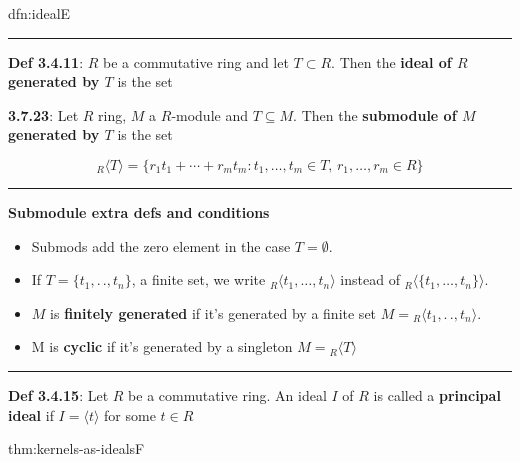 \documentclass[landscape, 8pt]{extarticle}
\begin{document}
\begin{multicols}{3}
\begin{dfn}{dfn:ideal}{E}
    \vspace{-7pt}
    \noindent\rule{\textwidth}{0.2pt}
    \vspace{-23pt}
    \setlength{\columnseprule}{0.5pt}
    \begin{multicols}{2}
        \textbf{Def 3.4.11}: $R$ be a commutative ring and let $T \subset R$. Then the \textbf{ideal of $R$ generated by $T$} is the set

        \columnbreak
        \textbf{3.7.23}: Let $R$ ring, $M$ a $R$-module and $T \subseteq M$. Then the \textbf{submodule of $M$ generated by $T$} is the set

    \end{multicols}
    \vspace{-20pt}

    \[{}_{R}\langle T \rangle = \{r_{1}t_{1}+\cdots+r_{m}t_{m} : t_{1},\dots,t_{m}\in T,\,r_{1},\dots,r_{m}\in R\}\]
    \vspace{-10pt}
    \noindent\rule{\textwidth}{0.2pt}

    \textbf{Submodule extra defs and conditions}
    \vspace{-3pt}
    \begin{itemize}[leftmargin=4pt, rightmargin=-2pt]
        \setlength\itemsep{0em}
        \item Submods add the zero element in the case $T = \emptyset$.
        \item If $T = \{t_{1},.\,.,t_{n}\}$, a finite set, we write ${}_{R}\langle t_{1},\dots,t_{n} \rangle$ instead of ${}_{R}\langle \{t_{1},\dots,t_{n}\} \rangle$.
        \item $M$ is \textbf{finitely generated} if it's generated by a finite set $M = {}_{R}\langle t_{1},.\,.,t_{n} \rangle$.
        \item M is \textbf{cyclic} if it's generated by a singleton $M = {}_{R}\langle T\rangle$
    \end{itemize}
    
    \vspace{-5pt}
    \noindent\rule{\textwidth}{0.2pt}
    \textbf{Def 3.4.15}: Let $R$ be a commutative ring. An ideal $I$ of $R$ is called a \textbf{principal ideal} if $I = \langle t \rangle$ for some $t\in R$
\end{dfn}

\vspace{-5pt}
\begin{thm}{thm:kernels-as-ideals}{F}


\end{thm}
\end{multicols}
\end{document}
